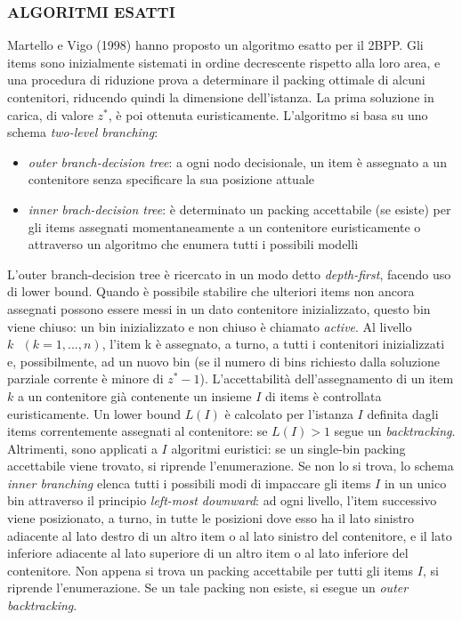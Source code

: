 \documentclass[12pt,a4paper,openright,twoside]{report}
\begin{document}
\subsubsection{ALGORITMI ESATTI}
Martello e Vigo (1998) hanno proposto un algoritmo esatto per il 2BPP. Gli items sono inizialmente sistemati in ordine decrescente rispetto alla loro area, e una procedura di riduzione prova a determinare il packing ottimale di alcuni contenitori, riducendo quindi la dimensione dell'istanza. La prima soluzione in carica, di valore $z^{*}$, \`{e} poi ottenuta euristicamente. L'algoritmo si basa su uno schema \textit{two-level branching}:
\begin{itemize}
\item \textit{outer branch-decision tree}: a ogni nodo decisionale, un item \`{e} assegnato a un contenitore senza specificare la sua posizione attuale
\item \textit{inner brach-decision tree}: \`{e} determinato un packing accettabile (se esiste) per gli items assegnati momentaneamente a un contenitore euristicamente o attraverso un algoritmo che enumera tutti i possibili modelli
\end{itemize}
L'outer branch-decision tree \`{e} ricercato in un modo detto \textit{depth-first}, facendo uso di lower bound. Quando \`{e} possibile stabilire che ulteriori items non ancora assegnati possono essere messi in un dato contenitore inizializzato, questo bin viene chiuso: un bin inizializzato e non chiuso \`{e} chiamato \textit{active}. Al livello $k \mbox{ }( k = 1, ..., n)$, l'item k \`{e} assegnato, a turno, a tutti i contenitori inizializzati e, possibilmente, ad un nuovo bin (se il numero di bins richiesto dalla soluzione parziale corrente \`{e} minore di $z^{*} - 1$). L'accettabilit\`{a} dell'assegnamento di un item $k$ a un contenitore gi\`{a} contenente un insieme $I$ di items \`{e} controllata euristicamente. Un lower bound $L(I)$ \`{e} calcolato per l'istanza $I$ definita dagli items correntemente assegnati al contenitore: se $L(I)>1$ segue un \textit{backtracking}. Altrimenti, sono applicati a $I$ algoritmi euristici: se un single-bin packing accettabile viene trovato, si riprende l'enumerazione. Se non lo si trova, lo schema \textit{inner branching} elenca tutti i possibili modi di impaccare gli items $I$ in un unico bin attraverso il principio \textit{left-most downward}: ad ogni livello, l'item successivo viene posizionato, a turno, in tutte le posizioni dove esso ha il lato sinistro adiacente al lato destro di un altro item o al lato sinistro del contenitore, e il lato inferiore adiacente al lato superiore di un altro item o al lato inferiore del contenitore. Non appena si trova un packing accettabile per tutti gli items $I$, si riprende l'enumerazione. Se un tale packing non esiste, si esegue un \textit{outer backtracking}.
\end{document}

